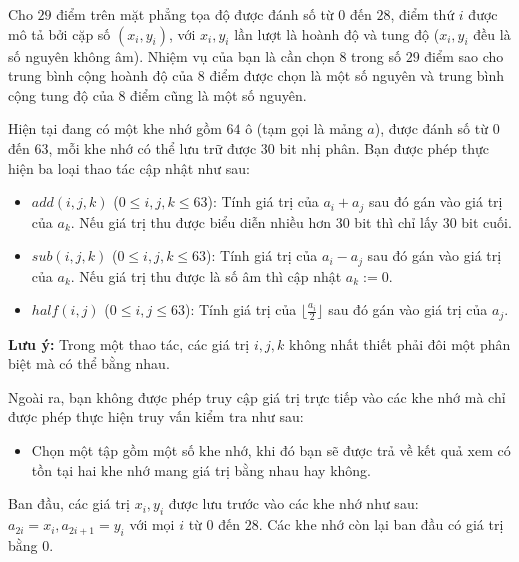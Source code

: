 Cho $29$ điểm trên mặt phẳng tọa độ được đánh số từ $0$ đến $28$, điểm thứ $i$ được mô tả bởi cặp số $(x_i,y_i)$, với $x_i,y_i$ lần lượt là hoành độ và tung độ ($x_i,y_i$ đều là số nguyên không âm). Nhiệm vụ của bạn là cần chọn $8$ trong số $29$ điểm sao cho trung bình cộng hoành độ của $8$ điểm được chọn là một số nguyên và trung bình cộng tung độ của $8$ điểm cũng là một số nguyên.

Hiện tại đang có một khe nhớ gồm $64$ ô (tạm gọi là mảng $a$), được đánh số từ $0$ đến $63$, mỗi khe nhớ có thể lưu trữ được $30$ bit nhị phân. Bạn được phép thực hiện ba loại thao tác cập nhật như sau:
\begin{itemize}
  \item $add(i,j,k)$ ($0\le i,j,k\le 63$): Tính giá trị của $a_i+a_j$ sau đó gán vào giá trị của $a_k$. Nếu giá trị thu được biểu diễn nhiều hơn $30$ bit thì chỉ lấy $30$ bit cuối.
  \item $sub(i,j,k)$ ($0\le i,j,k\le 63$): Tính giá trị của $a_i-a_j$ sau đó gán vào giá trị của $a_k$. Nếu giá trị thu được là số âm thì cập nhật $a_k:=0$.
  \item $half(i,j)$ ($0\le i,j\le 63$): Tính giá trị của $\lfloor \frac{a_i}2 \rfloor$ sau đó gán vào giá trị của $a_j$.
\end{itemize}

\textbf{Lưu ý:} Trong một thao tác, các giá trị $i,j,k$ không nhất thiết phải đôi một phân biệt mà có thể bằng nhau.

Ngoài ra, bạn không được phép truy cập giá trị trực tiếp vào các khe nhớ mà chỉ được phép thực hiện truy vấn kiểm tra như sau:
\begin{itemize}
   \item Chọn một tập gồm một số khe nhớ, khi đó bạn sẽ được trả về kết quả xem có tồn tại hai khe nhớ mang giá trị bằng nhau hay không.
\end{itemize}

Ban đầu, các giá trị $x_i,y_i$ được lưu trước vào các khe nhớ như sau: $a_{2i}=x_i,a_{2i+1}=y_i$ với mọi $i$ từ $0$ đến $28$. Các khe nhớ còn lại ban đầu có giá trị bằng $0$.